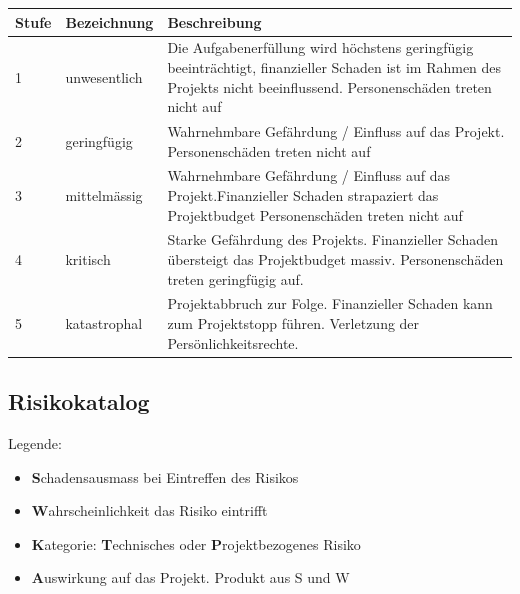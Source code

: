 \documentclass[a4paper]{scrreprt}
\begin{document}
\vspace{1em}
\noindent
\begin{tabularx}{\textwidth}{|l|l|X|}
	\hline
	\textbf{Stufe} & \textbf{Bezeichnung} & \textbf{Beschreibung} \\
	\hline
	1 & unwesentlich & Die Aufgabenerfüllung wird höchstens geringfügig beeinträchtigt, finanzieller Schaden ist im Rahmen des Projekts nicht beeinflussend. Personenschäden treten nicht auf \\
	\hline
	2 & geringfügig & Wahrnehmbare Gefährdung / Einfluss auf das Projekt. Personenschäden treten nicht auf \\
	\hline
	3 & mittelmässig & Wahrnehmbare Gefährdung / Einfluss auf das Projekt.Finanzieller Schaden strapaziert das Projektbudget
	Personenschäden treten nicht auf \\
	\hline
	4 & kritisch & Starke Gefährdung des Projekts. Finanzieller Schaden übersteigt das Projektbudget massiv. Personenschäden treten geringfügig auf.\\
	\hline
	5 & katastrophal & Projektabbruch zur Folge. Finanzieller Schaden kann zum Projektstopp führen. Verletzung der Persönlichkeitsrechte.
	\\
	\hline
\end{tabularx}

\subsection{Risikokatalog}
\label{sssec:Risikokatalog}
Legende:
\begin{itemize}
	\item \textbf{S}chadensausmass bei Eintreffen des Risikos
	\item \textbf{W}ahrscheinlichkeit das Risiko eintrifft
	\item \textbf{K}ategorie: \textbf{T}echnisches oder \textbf{P}rojektbezogenes Risiko
	\item \textbf{A}uswirkung auf das Projekt. Produkt aus S und W
\end{itemize}
\end{document}
